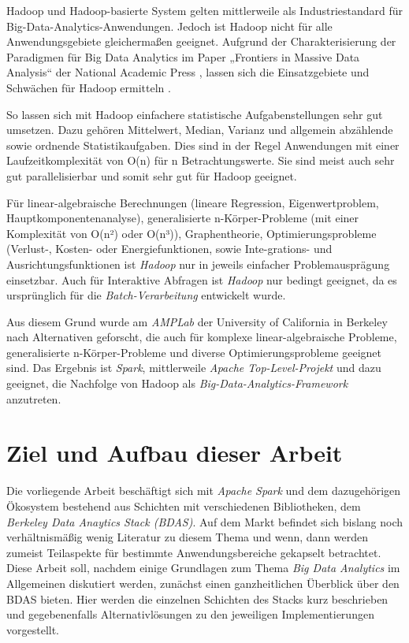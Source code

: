 Hadoop und Hadoop-basierte System gelten mittlerweile als Industriestandard für Big-Data-Analytics-Anwendungen. Jedoch ist Hadoop nicht für alle Anwendungsgebiete gleichermaßen geeignet. Aufgrund der Charakterisierung der Paradigmen für Big Data Analytics im Paper „Frontiers in Massive Data Analysis“ der National Academic Press , lassen sich die Einsatzgebiete und Schwächen für Hadoop ermitteln .

So lassen sich mit Hadoop einfachere statistische Aufgabenstellungen sehr gut umsetzen. Dazu gehören Mittelwert, Median, Varianz und allgemein abzählende sowie ordnende Statistikaufgaben. Dies sind in der Regel Anwendungen mit einer Laufzeitkomplexität von O(n) für n Betrachtungswerte. Sie sind meist auch sehr gut parallelisierbar und somit sehr gut für Hadoop geeignet.    



Für linear-algebraische Berechnungen (lineare Regression, Eigenwertproblem, Hauptkomponentenanalyse), generalisierte n-Körper-Probleme (mit einer Komplexität 
von O(n²) oder O(n³)), Graphentheorie, Optimierungsprobleme (Verlust-, Kosten- oder Energiefunktionen, sowie  Inte-grations- und Ausrichtungsfunktionen ist \textit{Hadoop} nur in jeweils einfacher Problemausprägung einsetzbar. Auch für Interaktive Abfragen ist \textit{Hadoop} nur bedingt geeignet, da es ursprünglich für die \textit{Batch-Verarbeitung} entwickelt wurde.

Aus diesem Grund wurde am \textit{AMPLab} der University of California in Berkeley nach Alternativen geforscht, die auch für komplexe linear-algebraische Probleme, generalisierte n-Körper-Probleme und diverse Optimierungsprobleme geeignet sind. Das Ergebnis ist \textit{Spark}, mittlerweile \textit{Apache Top-Level-Projekt} und dazu geeignet, die Nachfolge von Hadoop als \textit{Big-Data-Analytics-Framework} anzutreten. 

\section{Ziel und Aufbau dieser Arbeit}
\label{section:ziel dieser Arbeit}

Die vorliegende Arbeit beschäftigt sich mit \textit{Apache Spark} und dem dazugehörigen Ökosystem bestehend aus Schichten mit verschiedenen Bibliotheken, dem \textit{Berkeley Data Anaytics Stack (BDAS)}. Auf dem Markt befindet sich bislang noch verhältnismäßig wenig Literatur zu diesem Thema und wenn, dann werden zumeist Teilaspekte für bestimmte Anwendungsbereiche gekapselt betrachtet. Diese Arbeit soll, nachdem einige Grundlagen zum Thema \textit{Big Data Analytics} im Allgemeinen diskutiert werden, zunächst einen ganzheitlichen Überblick über den BDAS bieten. Hier werden die einzelnen Schichten des Stacks kurz beschrieben und gegebenenfalls Alternativlösungen zu den jeweiligen Implementierungen vorgestellt. 

